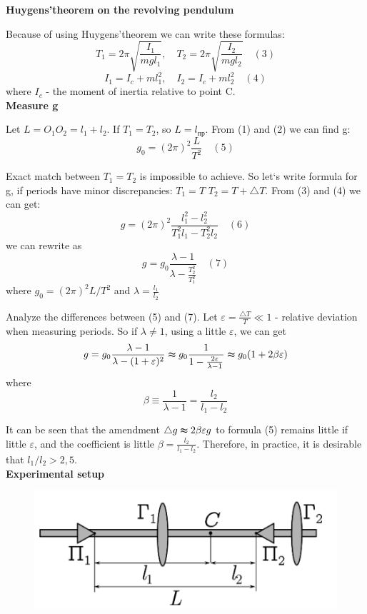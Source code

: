\documentclass[12pt]{article}
\begin{document}
\textbf{Huygens'theorem on the revolving pendulum}


Because of using Huygens'theorem we can write these formulas:
$$T_{1} = 2\pi\sqrt{\frac{I_{1}}{mgl_{1}}}, \quad T_{2} = 2\pi\sqrt{\frac{I_{2}}{mgl_{2}}} \quad (3)$$
$$I_{1} = I_{c} + ml_{1}^2, \quad I_{2} = I_{c} + ml_{2}^2 \quad (4)$$
where $I_{c}$ - the moment of inertia relative to point C.\\


\textbf{Measure g}

Let $L=O_{1}O_{2}=l_{1}+l_{2}$. If $T_{1}=T_{2}$, so $L=l_{\text{пр}}$. From (1) and (2) we can find g:
$$g_{0} = (2\pi)^2\frac{L}{T^2} \quad (5)$$

Exact match between $T_{1} = T_{2}$ is impossible to achieve. So let`s write formula for g, if periods have minor discrepancies: $T_{1}=T$ $T_{2}=T+\triangle T$. From (3) and (4) we can get:
$$g=(2\pi)^2\frac{l_{1}^2 - l_{2}^2}{T_{1}^2l_{1}-T_{2}^2l_{2}} \quad (6)$$
we can rewrite as
$$g=g_{0}\frac{\lambda - 1}{\lambda - \frac{T_{2}^2}{T_{1}^2}} \quad (7)$$
where $g_{0}=(2\pi)^2L/T^2$ and $\lambda = \frac{l_{1}}{l_{2}}$

Analyze the differences between (5) and (7). Let $\varepsilon =\frac{\triangle T}{T}\ll 1$ - relative deviation when measuring periods. So if $\lambda \neq 1$, using a little $\varepsilon$, we can get
$$g=g_{0}\frac{\lambda - 1}{\lambda - (1+\varepsilon)^2} \thickapprox g_{0}\frac{1}{1 - \frac{2\varepsilon}{\lambda - 1}} \thickapprox g_{0}(1+2\beta\varepsilon)$$
where
$$\beta \equiv \frac{1}{\lambda-1} = \frac{l_{2}}{l_{1}-l_{2}}$$

It can be seen that the amendment $\triangle g \thickapprox 2\beta\varepsilon g$ to formula (5) remains little if little $\varepsilon$, and the coefficient is little $\beta = \frac{l_{2}}{l_{1}-l_{2}}$. Therefore, in practice, it is desirable that $l_{1}/l_{2}>2,5$.\\

\textbf{Experimental setup}

\begin{figure}[h!]
    \centering
    \includegraphics{2022-11-15.png}
\end{figure}
\end{document}
